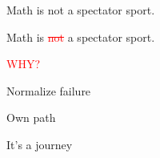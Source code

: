 \documentclass[14pt]{beamer}
\begin{document}
\begin{frame}\Large
  \begin{center}
    Math is not a spectator sport.
  \end{center}
\end{frame}

\begin{frame}\Large
  \begin{center}
    Math is \textcolor{red}{\sout{not}} a spectator sport.
  \end{center}
\end{frame}

\begin{frame}\Large
  \begin{center}
    \textcolor{red}{WHY?} 
  \end{center}
\end{frame}

\begin{frame}\Large
  \begin{center}
  \end{center}
\end{frame}


\begin{frame}\Large
  \begin{center}
    Normalize failure
  \end{center}
\end{frame}

\begin{frame}\Large
  \begin{center}
    Own path
  \end{center}
\end{frame}


\begin{frame}\Large
  \begin{center}
    It's a journey
  \end{center}
\end{frame}
\end{document}
